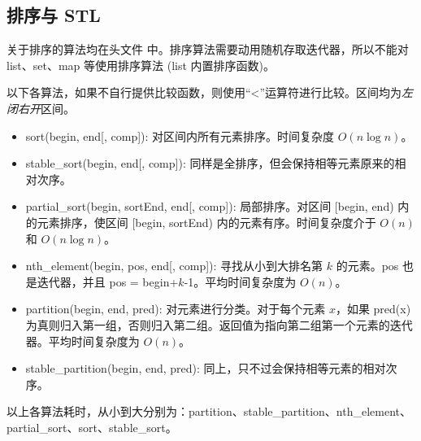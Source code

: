 \subsection{排序与 STL}
	关于排序的算法均在头文件  中。排序算法需要动用随机存取迭代器，所以不能对 list、set、map 等使用排序算法 (list 内置排序函数)。
	
	以下各算法，如果不自行提供比较函数，则使用“<”运算符进行比较。区间均为\emph{左闭右开}区间。
	
	\begin{itemize}
		\item sort(begin, end[, comp]): 对区间内所有元素排序。时间复杂度 $O(n\log n)$。
		\item stable\_{}sort(begin, end[, comp]): 同样是全排序，但会保持相等元素原来的相对次序。
		\item partial\_{}sort(begin, sortEnd, end[, comp]): 局部排序。对区间 [begin, end) 内的元素排序，使区间 [begin, sortEnd) 内的元素有序。时间复杂度介于 $O(n)$ 和 $O(n\log n)$。
		\item nth\_{}element(begin, pos, end[, comp]): 寻找从小到大排名第 $k$ 的元素。pos 也是迭代器，并且 pos = begin+$k$-1。平均时间复杂度为 $O(n)$。
		\item partition(begin, end, pred): 对元素进行分类。对于每个元素 $x$，如果 pred(x) 为真则归入第一组，否则归入第二组。返回值为指向第二组第一个元素的迭代器。平均时间复杂度为 $O(n)$。
		\item stable\_{}partition(begin, end, pred): 同上，只不过会保持相等元素的相对次序。
	\end{itemize}
	
	以上各算法耗时，从小到大分别为：partition、stable\_{}partition、nth\_{}element、partial\_{}sort、sort、stable\_{}sort。